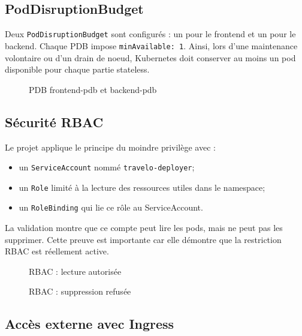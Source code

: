 \documentclass[11pt,a4paper]{article}
\begin{document}
\subsection{PodDisruptionBudget}

Deux \texttt{PodDisruptionBudget} sont configurés : un pour le frontend et un pour le backend. Chaque PDB impose \texttt{minAvailable: 1}. Ainsi, lors d'une maintenance volontaire ou d'un drain de noeud, Kubernetes doit conserver au moins un pod disponible pour chaque partie stateless.

\begin{figure}[H]
    \centering
    
    \caption{PDB frontend-pdb et backend-pdb}
\end{figure}

\subsection{Sécurité RBAC}

Le projet applique le principe du moindre privilège avec :
\begin{itemize}
    \item un \texttt{ServiceAccount} nommé \texttt{travelo-deployer};
    \item un \texttt{Role} limité à la lecture des ressources utiles dans le namespace;
    \item un \texttt{RoleBinding} qui lie ce rôle au ServiceAccount.
\end{itemize}

La validation montre que ce compte peut lire les pods, mais ne peut pas les supprimer. Cette preuve est importante car elle démontre que la restriction RBAC est réellement active.

\begin{figure}[H]
    \centering
    
    \caption{RBAC : lecture autorisée}
\end{figure}

\begin{figure}[H]
    \centering
    
    \caption{RBAC : suppression refusée}
\end{figure}

\subsection{Accès externe avec Ingress}
\end{document}
